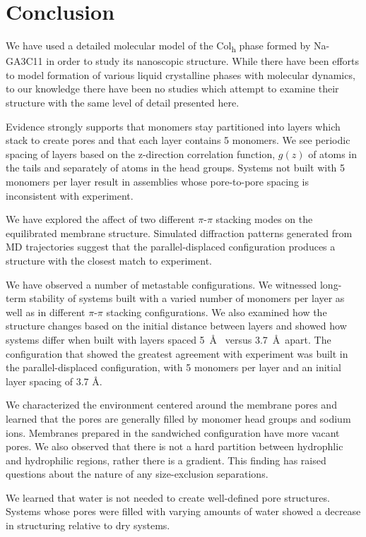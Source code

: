 \documentclass{article}
\begin{document}
  \section{Conclusion}
  
  We have used a detailed molecular model of the Col\textsubscript{h} phase
  formed by Na-GA3C11 in order to study its nanoscopic structure. While there
  have been efforts to model formation of various liquid crystalline phases with
  molecular dynamics, to our knowledge there have been no studies which attempt
  to examine their structure with the same level of detail presented here.

  Evidence strongly supports that monomers stay partitioned into layers which
  stack to create pores and that each layer contains 5 monomers. We see periodic
  spacing of layers based on the z-direction correlation function, $g(z)$ of
  atoms in the tails and separately of atoms in the head groups.  Systems not
  built with 5 monomers per layer result in assemblies whose pore-to-pore spacing
  is inconsistent with experiment. 

  We have explored the affect of two different $\pi$-$\pi$ stacking modes on
  the equilibrated membrane structure. Simulated diffraction patterns generated
  from MD trajectories suggest that the parallel-displaced configuration produces
  a structure with the closest match to experiment.

  We have observed a number of metastable configurations. We witnessed
  long-term stability of systems built with a varied number of monomers per layer
  as well as in different $\pi$-$\pi$ stacking configurations. We also examined
  how the structure changes based on the initial distance between layers and
  showed how systems differ when built with layers spaced 5~\AA~ versus
  3.7~\AA~apart. The configuration that showed the greatest agreement with
  experiment was built in the parallel-displaced configuration, with 5 monomers
  per layer and an initial layer spacing of 3.7 \AA.  

  We characterized the environment centered around the membrane pores and
  learned that the pores are generally filled by monomer head groups and sodium
  ions. Membranes prepared in the sandwiched configuration have more vacant
  pores. We also observed that there is not a hard partition between hydrophlic
  and hydrophilic regions, rather there is a gradient.  This finding has raised
  questions about the nature of any size-exclusion separations.  

  We learned that water is not needed to create well-defined pore structures.
  Systems whose pores were filled with varying amounts of water showed a decrease
  in structuring relative to dry systems. 
\end{document}
